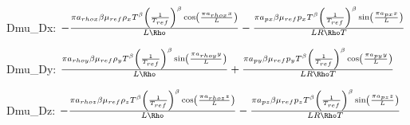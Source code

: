 

 Dmu_Dx: 
$- \frac{\pi a_{rhox} \beta \mu_{ref} \rho_{x} T^{\beta} \left(\frac{1}{T_{ref}}\right)^{\beta} \operatorname{cos}\left(\frac{\pi a_{rhox} x}{L}\right)}{L \Rho} - \frac{\pi a_{px} \beta \mu_{ref} p_{x} T^{\beta} \left(\frac{1}{T_{ref}}\right)^{\beta} \operatorname{sin}\left(\frac{\pi a_{px} x}{L}\right)}{L R \Rho T}$

 Dmu_Dy: 
$\frac{\pi a_{rhoy} \beta \mu_{ref} \rho_{y} T^{\beta} \left(\frac{1}{T_{ref}}\right)^{\beta} \operatorname{sin}\left(\frac{\pi a_{rhoy} y}{L}\right)}{L \Rho} + \frac{\pi a_{py} \beta \mu_{ref} p_{y} T^{\beta} \left(\frac{1}{T_{ref}}\right)^{\beta} \operatorname{cos}\left(\frac{\pi a_{py} y}{L}\right)}{L R \Rho T}$

 Dmu_Dz: 
$- \frac{\pi a_{rhoz} \beta \mu_{ref} \rho_{z} T^{\beta} \left(\frac{1}{T_{ref}}\right)^{\beta} \operatorname{cos}\left(\frac{\pi a_{rhoz} z}{L}\right)}{L \Rho} - \frac{\pi a_{pz} \beta \mu_{ref} p_{z} T^{\beta} \left(\frac{1}{T_{ref}}\right)^{\beta} \operatorname{sin}\left(\frac{\pi a_{pz} z}{L}\right)}{L R \Rho T}$